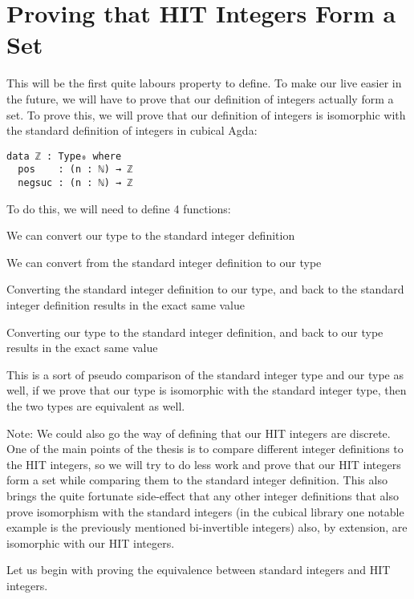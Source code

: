 \chapter{Proving that HIT Integers Form a Set}
\label{ch:set}
This will be the first quite labours property to define. To make our live easier in the future, we will have to prove that our definition of integers actually form a set. To prove this, we will prove that our definition of integers is isomorphic with the standard definition of integers in cubical Agda:
\begin{verbatim}
data ℤ : Type₀ where
  pos    : (n : ℕ) → ℤ
  negsuc : (n : ℕ) → ℤ
\end{verbatim}
To do this, we will need to define 4 functions:
\begin{compactitem}
  \item We can convert our type to the standard integer definition
  \item We can convert from the standard integer definition to our type
  \item Converting the standard integer definition to our type, and back to the standard integer definition results in the exact same value
  \item Converting our type to the standard integer definition, and back to our type results in the exact same value
\end{compactitem}
This is a sort of pseudo comparison of the standard integer type and our type as well, if we prove that our type is isomorphic with the standard integer type, then the two types are equivalent as well.

Note: We could also go the way of defining that our HIT integers are discrete. One of the main points of the thesis is to compare different integer definitions to the HIT integers, so we will try to do less work and prove that our HIT integers form a set while comparing them to the standard integer definition. This also brings the quite fortunate side-effect that any other integer definitions that also prove isomorphism with the standard integers (in the cubical library one notable example is the previously mentioned bi-invertible integers) also, by extension, are isomorphic with our HIT integers.

Let us begin with proving the equivalence between standard integers and HIT integers.

